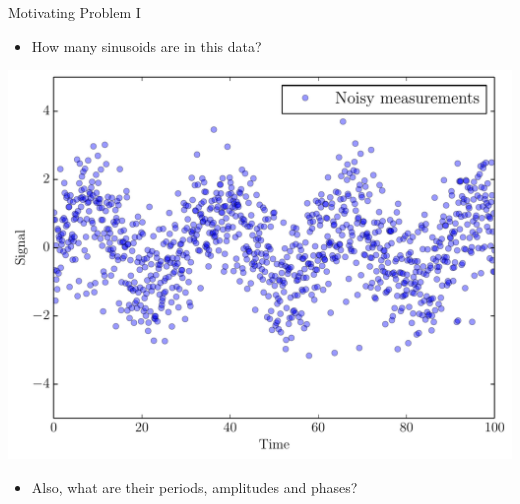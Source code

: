 
\begin{frame}[t,plain]
\titlepage
\end{frame}

\begin{frame}[t]{Motivating Problem I}
\begin{itemize}
\item How many sinusoids are in this data?
\end{itemize}
\begin{center}
\includegraphics[scale=0.35]{sinewave_data.pdf}
\end{center}
\begin{itemize}
\item Also, what are their periods, amplitudes and phases?
\end{itemize}
\end{frame}

